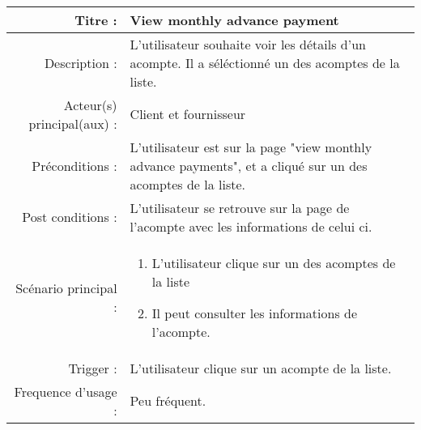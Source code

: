 \documentclass[../rapport.tex]{subfiles}
\begin{document}
\\ \\ \\
\begin{tabular}{|r|p{9cm}|}
    \hline
    Titre : & View monthly advance payment  \\
    \hline
    Description : & L'utilisateur souhaite voir les détails d'un acompte. Il a séléctionné un des acomptes de la liste. \\
    \hline
    Acteur(s) principal(aux) : & Client et fournisseur\\
    \hline
    Préconditions : & L'utilisateur est sur la page "view monthly advance payments", et a cliqué sur un des acomptes de la liste.\\
    \hline 
    Post conditions : & L'utilisateur se retrouve sur la page de l'acompte avec les informations de celui ci.\\
    \hline 
    Scénario principal : & \begin{enumerate}
        \item L'utilisateur clique sur un des acomptes de la liste
        \item Il peut consulter les informations de l'acompte.
    \end{enumerate} \nointerlineskip \\
    \hline
    Trigger : & L'utilisateur clique sur un acompte de la liste. \\
    \hline
    Frequence d'usage : & Peu fréquent.\\
    \hline
\end{tabular}
\\ \\ \\
\end{document}
